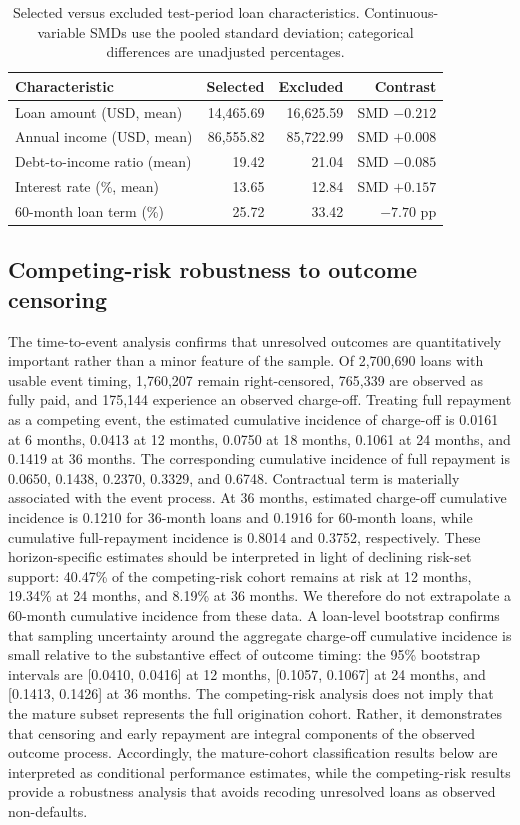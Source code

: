 \documentclass[10pt]{article}
\begin{document}
\begin{table}[!htbp]
\centering\small
\caption{Selected versus excluded test-period loan characteristics. Continuous-variable SMDs use the pooled standard deviation; categorical differences are unadjusted percentages.}
\label{tab:selection_balance}
\begin{tabular}{lrrr}
\toprule
Characteristic & Selected & Excluded & Contrast\\
\midrule
Loan amount (USD, mean) & 14,465.69 & 16,625.59 & SMD $-0.212$\\
Annual income (USD, mean) & 86,555.82 & 85,722.99 & SMD $+0.008$\\
Debt-to-income ratio (mean) & 19.42 & 21.04 & SMD $-0.085$\\
Interest rate (\%, mean) & 13.65 & 12.84 & SMD $+0.157$\\
60-month loan term (\%) & 25.72 & 33.42 & $-7.70$ pp\\
\bottomrule
\end{tabular}
\end{table}

\subsection{Competing-risk robustness to outcome censoring}

The time-to-event analysis confirms that unresolved outcomes are quantitatively important rather than a minor feature of the sample. Of 2,700,690 loans with usable event timing, 1,760,207 remain right-censored, 765,339 are observed as fully paid, and 175,144 experience an observed charge-off. Treating full repayment as a competing event, the estimated cumulative incidence of charge-off is 0.0161 at 6 months, 0.0413 at 12 months, 0.0750 at 18 months, 0.1061 at 24 months, and 0.1419 at 36 months. The corresponding cumulative incidence of full repayment is 0.0650, 0.1438, 0.2370, 0.3329, and 0.6748. Contractual term is materially associated with the event process. At 36 months, estimated charge-off cumulative incidence is 0.1210 for 36-month loans and 0.1916 for 60-month loans, while cumulative full-repayment incidence is 0.8014 and 0.3752, respectively. These horizon-specific estimates should be interpreted in light of declining risk-set support: 40.47\% of the competing-risk cohort remains at risk at 12 months, 19.34\% at 24 months, and 8.19\% at 36 months. We therefore do not extrapolate a 60-month cumulative incidence from these data. A loan-level bootstrap confirms that sampling uncertainty around the aggregate charge-off cumulative incidence is small relative to the substantive effect of outcome timing: the 95\% bootstrap intervals are [0.0410, 0.0416] at 12 months, [0.1057, 0.1067] at 24 months, and [0.1413, 0.1426] at 36 months. The competing-risk analysis does not imply that the mature subset represents the full origination cohort. Rather, it demonstrates that censoring and early repayment are integral components of the observed outcome process. Accordingly, the mature-cohort classification results below are interpreted as conditional performance estimates, while the competing-risk results provide a robustness analysis that avoids recoding unresolved loans as observed non-defaults.
\end{document}
